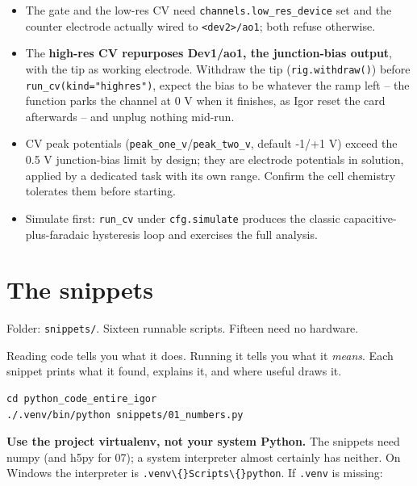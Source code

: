 \begin{itemize}[leftmargin=*]
\item The gate and the low-res CV need \texttt{channels.\discretionary{}{}{}low\_\discretionary{}{}{}res\_\discretionary{}{}{}device} set and the counter electrode actually wired to \texttt{<dev2>/\discretionary{}{}{}ao1}; both refuse otherwise.
\item The \textbf{high-res CV repurposes Dev1/ao1, the junction-bias output}, with the tip as working electrode. Withdraw the tip (\texttt{rig.\discretionary{}{}{}withdraw()}) before \texttt{run\_\discretionary{}{}{}cv(kind="highres")}, expect the bias to be whatever the ramp left -- the function parks the channel at 0 V when it finishes, as Igor reset the card afterwards -- and unplug nothing mid-run.
\item CV peak potentials (\texttt{peak\_\discretionary{}{}{}one\_\discretionary{}{}{}v}/\texttt{peak\_\discretionary{}{}{}two\_\discretionary{}{}{}v}, default -1/+1 V) exceed the 0.5 V junction-bias limit by design; they are electrode potentials in solution, applied by a dedicated task with its own range. Confirm the cell chemistry tolerates them before starting.
\item Simulate first: \texttt{run\_\discretionary{}{}{}cv} under \texttt{cfg.\discretionary{}{}{}simulate} produces the classic capacitive-plus-faradaic hysteresis loop and exercises the full analysis.
\end{itemize}

\setcounter{chapter}{3}
\chapter{The snippets}

\begin{keybox}\small Folder: \texttt{snippets/\discretionary{}{}{}}. Sixteen runnable scripts. Fifteen need no hardware.\end{keybox}

Reading code tells you what it does. Running it tells you what it \emph{means}. Each snippet prints what it found, explains it, and where useful draws it.

\begin{lstlisting}[style=out]
cd python_code_entire_igor
./.venv/bin/python snippets/01_numbers.py
\end{lstlisting}

\textbf{Use the project virtualenv, not your system Python.} The snippets need numpy (and h5py for 07); a system interpreter almost certainly has neither. On Windows the interpreter is \texttt{.\discretionary{}{}{}venv\textbackslash\{\}Scripts\textbackslash\{\}python}. If \texttt{.\discretionary{}{}{}venv} is missing:

